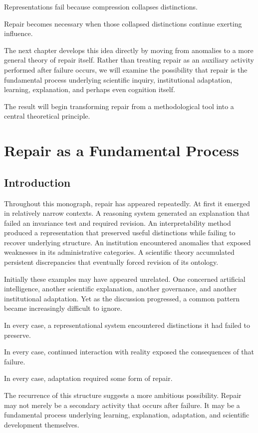 \documentclass[11pt,oneside,openany]{book}
\begin{document}
Representations fail because compression collapses distinctions.

Repair becomes necessary when those collapsed distinctions continue exerting influence.

The next chapter develops this idea directly by moving from anomalies to a more general theory of repair itself. Rather than treating repair as an auxiliary activity performed after failure occurs, we will examine the possibility that repair is the fundamental process underlying scientific inquiry, institutional adaptation, learning, explanation, and perhaps even cognition itself.

The result will begin transforming repair from a methodological tool into a central theoretical principle.

\chapter{Repair as a Fundamental Process}

\section{Introduction}

Throughout this monograph, repair has appeared repeatedly. At first it emerged in relatively narrow contexts. A reasoning system generated an explanation that failed an invariance test and required revision. An interpretability method produced a representation that preserved useful distinctions while failing to recover underlying structure. An institution encountered anomalies that exposed weaknesses in its administrative categories. A scientific theory accumulated persistent discrepancies that eventually forced revision of its ontology.

Initially these examples may have appeared unrelated. One concerned artificial intelligence, another scientific explanation, another governance, and another institutional adaptation. Yet as the discussion progressed, a common pattern became increasingly difficult to ignore.

In every case, a representational system encountered distinctions it had failed to preserve.

In every case, continued interaction with reality exposed the consequences of that failure.

In every case, adaptation required some form of repair.

The recurrence of this structure suggests a more ambitious possibility. Repair may not merely be a secondary activity that occurs after failure. It may be a fundamental process underlying learning, explanation, adaptation, and scientific development themselves.
\end{document}
